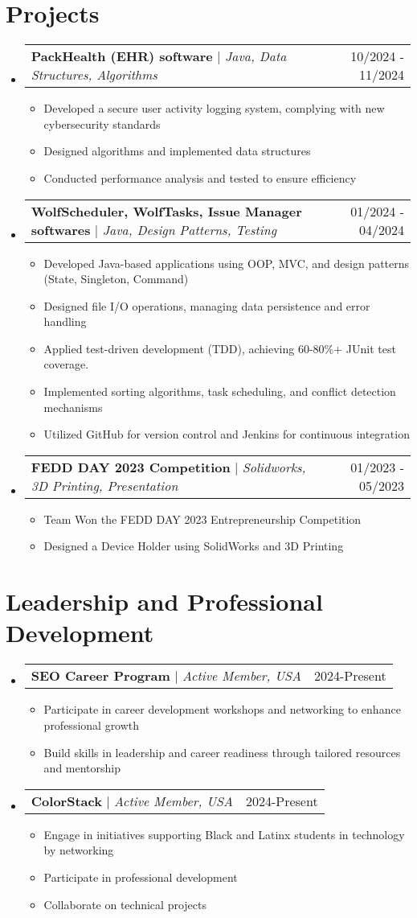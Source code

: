 \documentclass[letterpaper,11pt]{article}
\makeatletter
\newcommand{\resumeItem}[1]{
  \item\small{
    {#1 \vspace{-2pt}}
  }
}
\newcommand{\resumeProjectHeading}[2]{
    \item
    \begin{tabular*}{0.97\textwidth}{l@{\extracolsep{\fill}}r}
      \small#1 & #2 \\
    \end{tabular*}\vspace{-7pt}
}
\newcommand{\resumeSubHeadingListStart}{\begin{itemize}[leftmargin=0.15in, label={}]}
\newcommand{\resumeSubHeadingListEnd}{\end{itemize}}
\newcommand{\resumeItemListStart}{\begin{itemize}}
\newcommand{\resumeItemListEnd}{\end{itemize}\vspace{-5pt}}
\makeatother
\begin{document}
\section{Projects}
    \resumeSubHeadingListStart
      \resumeProjectHeading
          {\textbf{PackHealth (EHR) software} $|$ \emph{Java, Data Structures, Algorithms}}{10/2024 - 11/2024}
          \resumeItemListStart
            \resumeItem{Developed a secure user activity logging system, complying with new cybersecurity standards}
            \resumeItem{Designed algorithms and implemented data structures}
            \resumeItem{Conducted performance analysis and tested to ensure efficiency}
          \resumeItemListEnd
        \resumeProjectHeading
          {\textbf{WolfScheduler, WolfTasks, Issue Manager softwares} $|$ \emph{Java, Design Patterns, Testing}}{01/2024 - 04/2024}
          \resumeItemListStart
            \resumeItem{Developed Java-based applications using OOP, MVC, and design patterns (State, Singleton, Command)}
            \resumeItem{Designed file I/O operations, managing data persistence and error handling}
            \resumeItem{Applied test-driven development (TDD), achieving 60-80\%+ JUnit test coverage.}
            \resumeItem{Implemented sorting algorithms, task scheduling, and conflict detection mechanisms}
            \resumeItem{Utilized GitHub for version control and Jenkins for continuous integration}
          \resumeItemListEnd
      \resumeProjectHeading
          {\textbf{FEDD DAY 2023 Competition} $|$ \emph{Solidworks, 3D Printing, Presentation}}{01/2023 - 05/2023}
          \resumeItemListStart
            \resumeItem{Team Won the FEDD DAY 2023 Entrepreneurship Competition}
            \resumeItem{Designed a Device Holder using SolidWorks and 3D Printing}
          \resumeItemListEnd
    \resumeSubHeadingListEnd
     
 \section{Leadership and Professional Development}
    \resumeSubHeadingListStart
        \resumeProjectHeading
          {\textbf{SEO Career Program} $|$ \emph{Active Member, USA}}{2024-Present}
          \resumeItemListStart
            \resumeItem{Participate in career development workshops and networking to enhance professional growth}
            \resumeItem{Build skills in leadership and career readiness through tailored resources and mentorship}
          \resumeItemListEnd
      \resumeProjectHeading
          {\textbf{ColorStack} $|$ \emph{Active Member, USA}}{2024-Present}
          \resumeItemListStart
            \resumeItem{Engage in initiatives supporting Black and Latinx students in technology by networking}
            \resumeItem{Participate in professional development}
            \resumeItem{Collaborate on technical projects}
          \resumeItemListEnd          
    \resumeSubHeadingListEnd

\end{document}
